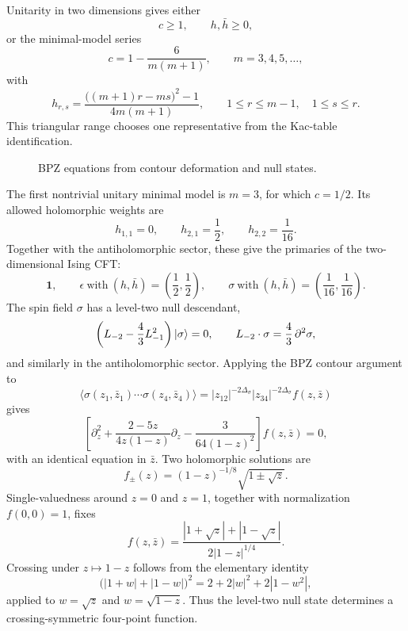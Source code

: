 Unitarity in two dimensions gives either
\[
  c\ge1,\qquad h,\bar h\ge0,
\]
or the minimal-model series
\[
  c=1-\frac{6}{m(m+1)},\qquad m=3,4,5,\ldots,
\]
with
\[
  h_{r,s}
  =
  \frac{\bigl((m+1)r-ms\bigr)^2-1}{4m(m+1)},
  \qquad
  1\le r\le m-1,\quad 1\le s\le r.
\]
This triangular range chooses one representative from the Kac-table
identification.

\begin{figure}[htbp]
\centering
{}
\caption{BPZ equations from contour deformation and null states.}
\end{figure}

The first nontrivial unitary minimal model is \(m=3\), for which
\(c=1/2\).  Its allowed holomorphic weights are
\[
  h_{1,1}=0,\qquad h_{2,1}=\frac12,\qquad h_{2,2}=\frac1{16}.
\]
Together with the antiholomorphic sector, these give the primaries of
the two-dimensional Ising CFT:
\[
  \mathbf1,\qquad
  \epsilon\ \text{with}\ (h,\bar h)=\left(\frac12,\frac12\right),
  \qquad
  \sigma\ \text{with}\ (h,\bar h)=\left(\frac1{16},\frac1{16}\right).
\]
The spin field \(\sigma\) has a level-two null descendant,
\[
  \left(L_{-2}-\frac43L_{-1}^2\right)\ket\sigma=0,
  \qquad
  L_{-2}\cdot\sigma=\frac43\,\partial^2\sigma ,
\]
and similarly in the antiholomorphic sector.  Applying the BPZ contour
argument to
\[
  \langle\sigma(z_1,\bar z_1)\cdots\sigma(z_4,\bar z_4)\rangle
  =
  |z_{12}|^{-2\Delta_\sigma}|z_{34}|^{-2\Delta_\sigma} f(z,\bar z)
\]
gives
\[
  \left[
    \partial_z^2
    +\frac{2-5z}{4z(1-z)}\partial_z
    -\frac{3}{64(1-z)^2}
  \right]f(z,\bar z)=0,
\]
with an identical equation in \(\bar z\).  Two holomorphic solutions are
\[
  f_\pm(z)=(1-z)^{-1/8}\sqrt{1\pm\sqrt z}.
\]
Single-valuedness around \(z=0\) and \(z=1\), together with
normalization \(f(0,0)=1\), fixes
\[
  f(z,\bar z)
  =
  \frac{|1+\sqrt z|+|1-\sqrt z|}
       {2|1-z|^{1/4}}.
\]
Crossing under \(z\mapsto1-z\) follows from the elementary identity
\[
  \bigl(|1+w|+|1-w|\bigr)^2
  =
  2+2|w|^2+2|1-w^2|,
\]
applied to \(w=\sqrt z\) and \(w=\sqrt{1-z}\).  Thus the level-two null
state determines a crossing-symmetric four-point function.

